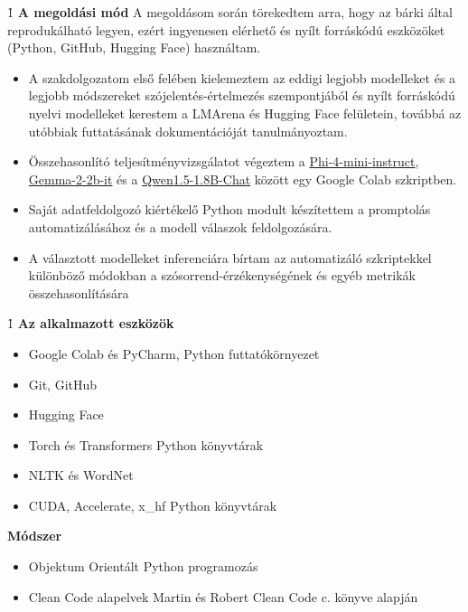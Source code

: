 \documentclass[12pt]{report}
\theoremstyle{definition}
\begin{document}
\h1 \textbf{A megoldási mód}
    A megoldásom során törekedtem arra, hogy az bárki által reprodukálható legyen, ezért ingyenesen elérhető és nyílt forráskódú eszközöket (Python, GitHub, Hugging Face) használtam.
      \begin{itemize}
        \item
              A szakdolgozatom első felében kielemeztem az eddigi legjobb modelleket és a legjobb módszereket szójelentés-értelmezés szempontjából és nyílt forráskódú nyelvi modelleket kerestem a LMArena és Hugging Face felületein, továbbá az utóbbiak futtatásának dokumentációját tanulmányoztam.
            \item Összehasonlító teljesítményvizsgálatot végeztem a
            \href{https://huggingface.co/microsoft/Phi-4-mini-instruct}{Phi-4-mini-instruct}, \href{https://huggingface.co/google/gemma-2-2b-it}{Gemma-2-2b-it} és a \href{https://huggingface.co/Qwen/Qwen1.5-1.8B-Chat}{Qwen1.5-1.8B-Chat} között egy Google Colab szkriptben.
        \item
              Saját adatfeldolgozó kiértékelő Python modult készítettem a promptolás automatizálásához és a modell válaszok feldolgozására.
        \item A választott modelleket inferenciára bírtam az automatizáló szkriptekkel különböző módokban a szósorrend-érzékenységének és egyéb metrikák összehasonlítására

      \end{itemize}
\h1 \textbf{Az alkalmazott eszközök}
      \begin{itemize}

        \item Google Colab és PyCharm, Python futtatókörnyezet
        \item Git, GitHub
        \item Hugging Face
        \item Torch és Transformers Python könyvtárak
        \item NLTK és WordNet
        \item CUDA, Accelerate, x\_hf Python könyvtárak

      \end{itemize}
      \item \textbf{Módszer}
      \begin{itemize}

        \item Objektum Orientált Python programozás
        \item Clean Code alapelvek Martin és Robert Clean Code c. könyve \cite{martin2008cleancode} alapján

      \end{itemize}
\end{document}
